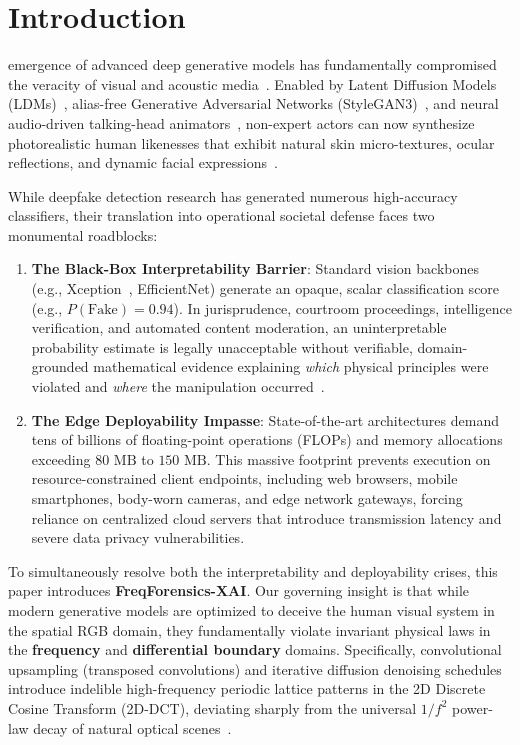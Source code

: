 \documentclass[journal]{IEEEtran}
\begin{document}
\section{Introduction}
 emergence of advanced deep generative models has fundamentally compromised the veracity of visual and acoustic media~\cite{verdoliva2020media}. Enabled by Latent Diffusion Models (LDMs)~\cite{rombach2022high}, alias-free Generative Adversarial Networks (StyleGAN3)~\cite{karras2021alias}, and neural audio-driven talking-head animators~\cite{zhang2023sadtalker}, non-expert actors can now synthesize photorealistic human likenesses that exhibit natural skin micro-textures, ocular reflections, and dynamic facial expressions~\cite{wang2020cnn}.

While deepfake detection research has generated numerous high-accuracy classifiers, their translation into operational societal defense faces two monumental roadblocks:
\begin{enumerate}
    \item \textbf{The Black-Box Interpretability Barrier}: Standard vision backbones (e.g., Xception~\cite{chollet2017xception}, EfficientNet) generate an opaque, scalar classification score (e.g., $P(\text{Fake}) = 0.94$). In jurisprudence, courtroom proceedings, intelligence verification, and automated content moderation, an uninterpretable probability estimate is legally unacceptable without verifiable, domain-grounded mathematical evidence explaining \textit{which} physical principles were violated and \textit{where} the manipulation occurred~\cite{selvaraju2017grad}.
    \item \textbf{The Edge Deployability Impasse}: State-of-the-art architectures demand tens of billions of floating-point operations (FLOPs) and memory allocations exceeding $80\text{ MB}$ to $150\text{ MB}$. This massive footprint prevents execution on resource-constrained client endpoints, including web browsers, mobile smartphones, body-worn cameras, and edge network gateways, forcing reliance on centralized cloud servers that introduce transmission latency and severe data privacy vulnerabilities.
\end{enumerate}

To simultaneously resolve both the interpretability and deployability crises, this paper introduces \textbf{FreqForensics-XAI}. Our governing insight is that while modern generative models are optimized to deceive the human visual system in the spatial RGB domain, they fundamentally violate invariant physical laws in the \textbf{frequency} and \textbf{differential boundary} domains. Specifically, convolutional upsampling (transposed convolutions) and iterative diffusion denoising schedules introduce indelible high-frequency periodic lattice patterns in the 2D Discrete Cosine Transform (2D-DCT), deviating sharply from the universal $1/f^2$ power-law decay of natural optical scenes~\cite{frank2020leveraging, durall2020watch, ruderman1994statistics, field1987relations}.
\end{document}
